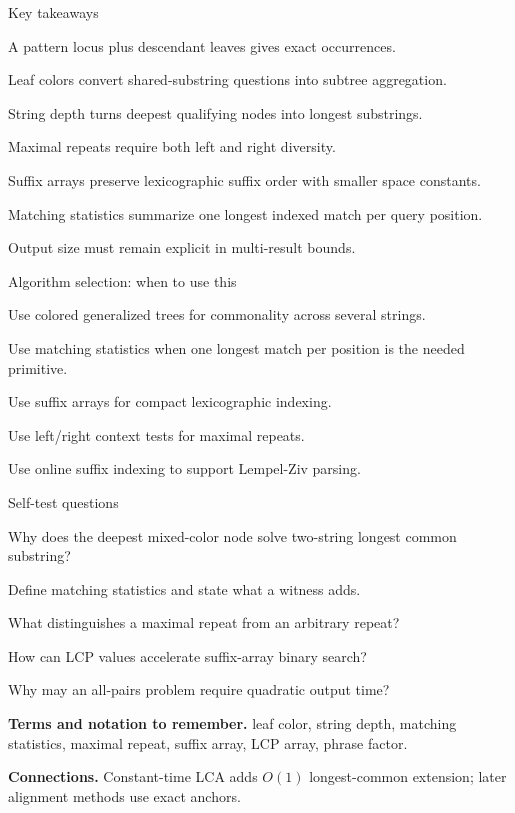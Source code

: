 \documentclass[11pt,letterpaper]{article}
\begin{document}
\begin{CornellSummaryBox}{Key takeaways}
\begin{CornellRecallList}
  \item A pattern locus plus descendant leaves gives exact occurrences.
  \item Leaf colors convert shared-substring questions into subtree aggregation.
  \item String depth turns deepest qualifying nodes into longest substrings.
  \item Maximal repeats require both left and right diversity.
  \item Suffix arrays preserve lexicographic suffix order with smaller space constants.
  \item Matching statistics summarize one longest indexed match per query position.
  \item Output size must remain explicit in multi-result bounds.
\end{CornellRecallList}
\end{CornellSummaryBox}

\begin{CornellOverviewBox}{Algorithm selection: when to use this}
\begin{CornellChecklist}
  \item Use colored generalized trees for commonality across several strings.
  \item Use matching statistics when one longest match per position is the needed primitive.
  \item Use suffix arrays for compact lexicographic indexing.
  \item Use left/right context tests for maximal repeats.
  \item Use online suffix indexing to support Lempel-Ziv parsing.
\end{CornellChecklist}
\end{CornellOverviewBox}

\begin{CornellExamBox}{Self-test questions}
\begin{CornellRecallList}
  \item Why does the deepest mixed-color node solve two-string longest common substring?
  \item Define matching statistics and state what a witness adds.
  \item What distinguishes a maximal repeat from an arbitrary repeat?
  \item How can LCP values accelerate suffix-array binary search?
  \item Why may an all-pairs problem require quadratic output time?
\end{CornellRecallList}
\end{CornellExamBox}

{\footnotesize
\textbf{Terms and notation to remember.} leaf color, string depth, matching statistics, maximal repeat, suffix array, LCP array, phrase factor.

\textbf{Connections.} Constant-time LCA adds $O(1)$ longest-common extension; later alignment methods use exact anchors.
}
\end{document}
